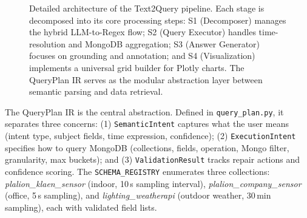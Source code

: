 \documentclass[preprint,12pt,a4paper]{elsarticle}
\begin{document}
\begin{figure}[H]
{
}
\caption{Detailed architecture of the Text2Query pipeline. Each stage is decomposed into its core processing steps: S1 (Decomposer) manages the hybrid LLM-to-Regex flow; S2 (Query Executor) handles time-resolution and MongoDB aggregation; S3 (Answer Generator) focuses on grounding and annotation; and S4 (Visualization) implements a universal grid builder for Plotly charts. The QueryPlan IR serves as the modular abstraction layer between semantic parsing and data retrieval.}
\label{fig:architecture}
\end{figure}

The QueryPlan IR is the central abstraction. Defined in \texttt{query\_plan.py}, it separates three concerns: (1) \texttt{SemanticIntent} captures what the user means (intent type, subject fields, time expression, confidence); (2) \texttt{ExecutionIntent} specifies how to query MongoDB (collections, fields, operation, Mongo filter, granularity, max buckets); and (3) \texttt{ValidationResult} tracks repair actions and confidence scoring. The \texttt{SCHEMA\_REGISTRY} enumerates three collections: \emph{plalion\_klaen\_sensor} (indoor, 10\,s sampling interval), \emph{plalion\_company\_sensor} (office, 5\,s sampling), and \emph{lighting\_weatherapi} (outdoor weather, 30\,min sampling), each with validated field lists.
\end{document}
